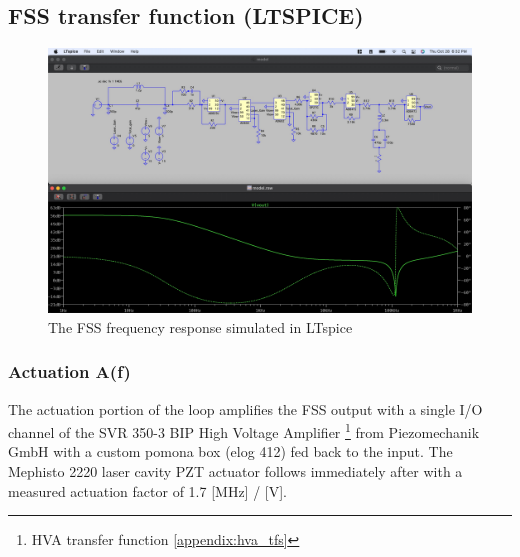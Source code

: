 \begin{landscape}
    \section{FSS transfer function (LTSPICE)}\label{fig:fss_tf}
\begin{figure}[H]
  \begin{center}
    \includegraphics[width=1.33\textwidth]{figs/ALGAAS/tfs/spice_FSS_tf.pdf}
    \caption{The FSS frequency response simulated in LTspice}
  \end{center}
  \label{fig:spiceFSS}
\end{figure}
\end{landscape}


\subsubsection{Actuation A(f)}
The actuation portion of the loop amplifies the FSS output with a single I/O channel of the SVR 350-3 BIP High Voltage Amplifier \footnote{HVA transfer function \autoref{appendix:hva_tfs}} from Piezomechanik GmbH with a custom pomona box (elog 412) fed back to the input. The Mephisto 2220 laser cavity PZT actuator follows immediately after with a measured actuation factor of 1.7 [MHz] / [V].


